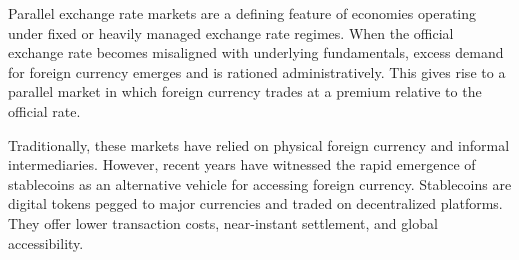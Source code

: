Parallel exchange rate markets are a defining feature of economies operating under fixed or heavily managed exchange rate regimes. When the official exchange rate becomes misaligned with underlying fundamentals, excess demand for foreign currency emerges and is rationed administratively. This gives rise to a parallel market in which foreign currency trades at a premium relative to the official rate.

Traditionally, these markets have relied on physical foreign currency and informal intermediaries. However, recent years have witnessed the rapid emergence of stablecoins as an alternative vehicle for accessing foreign currency. Stablecoins are digital tokens pegged to major currencies and traded on decentralized platforms. They offer lower transaction costs, near-instant settlement, and global accessibility.
